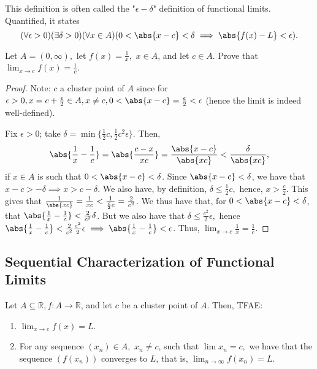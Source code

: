 \documentclass[12pt]{article}
\begin{document}
\begin{remark}
  This definition is often called the "$\epsilon-\delta$" definition of functional limits. Quantified, it states \[
  (\forall \epsilon > 0)(\exists \delta > 0)(\forall x \in A)(0 < \abs{x - c} < \delta\implies \abs{f(x) - L} < \epsilon).  
  \]
\end{remark}

\begin{example}
  Let $A = (0, \infty),$ let $f(x) = \frac{1}{x},$ $x \in A$, and let $c \in A$. Prove that $\lim_{x\to c} f(x) = \frac{1}{c}$.
  \begin{proof}
    Note: $c$ a cluster point of $A$ since for $\epsilon > 0, x = c + \frac{\epsilon}{2} \in A, x \neq c, 0 < \abs{x - c} = \frac{\epsilon}{2} < \epsilon$ (hence the limit is indeed well-defined).

    Fix $\epsilon > 0$; take $\delta = \min \{\frac{1}{2}c, \frac{1}{2}c^2\epsilon\}$. Then, \begin{align*}
      \abs{\frac{1}{x} - \frac{1}{c}} = \abs{\frac{c-x}{xc}} = \frac{\abs{x - c}}{\abs{xc}}< \frac{\delta}{\abs{xc}},
    \end{align*}
    if $x \in A$ is such that $0 < \abs{x - c} < \delta$. Since $\abs{x - c} < \delta$, we have that $x -c > - \delta \implies x > c - \delta$. We also have, by definition, $\delta \leq \frac{1}{2} c,$ hence, $x > \frac{c}{2}$. This gives that $\frac{1}{\abs{xc}} = \frac{1}{xc} < \frac{1}{\frac{c}{2}c} = \frac{2}{c^2}$. We thus have that, for $0 < \abs{x - c} < \delta$, that $\abs{\frac{1}{x} - \frac{1}{c}} < \frac{2}{c^2}\delta$. But we also have that $\delta \leq \frac{c^2}{2}\epsilon,$ hence $\abs{\frac{1}{x} - \frac{1}{c}}< \frac{2}{c^2} \frac{c^2}{2}\epsilon \implies \abs{\frac{1}{x} - \frac{1}{c}} < \epsilon$. Thus, $\lim_{x\to c} \frac{1}{x} = \frac{1}{c}$.
  \end{proof}
\end{example}

\subsection{Sequential Characterization of Functional Limits}

\begin{theorem}\label{thm:seqqqqqqqquentialfunctionallimit}
  Let $A \subseteq \mathbb{R}, f : A \to \mathbb{R}$, and let $c$ be a cluster point of $A$. Then, TFAE:
  \begin{enumerate}
    \item $\lim_{x\to c}f(x) = L$.
    \item For any sequence $(x_n) \in A,$ $x_n \neq c$, such that $\lim x_n = c,$ we have that the sequence $(f(x_n))$ converges to $L$, that is, $\lim_{n\to\infty} f(x_n) = L$.
  \end{enumerate}
\end{theorem}
\end{document}
